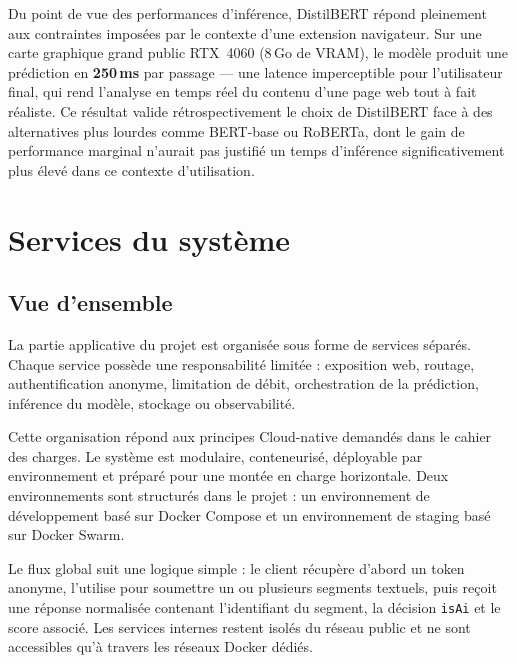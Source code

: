 ﻿\documentclass[12pt, a4paper]{report}
\begin{document}
Du point de vue des performances d'inférence, DistilBERT répond pleinement
aux contraintes imposées par le contexte d'une extension navigateur. Sur
une carte graphique grand public RTX~4060 (8\,Go de VRAM), le modèle
produit une prédiction en \textbf{250\,ms} par passage — une latence
imperceptible pour l'utilisateur final, qui rend l'analyse en temps réel
du contenu d'une page web tout à fait réaliste. Ce résultat valide
rétrospectivement le choix de DistilBERT face à des alternatives plus
lourdes comme BERT-base ou RoBERTa, dont le gain de performance marginal
n'aurait pas justifié un temps d'inférence significativement plus élevé
dans ce contexte d'utilisation.


\chapter{Services du système}

\section{Vue d'ensemble}

La partie applicative du projet est organisée sous forme de services séparés.
Chaque service possède une responsabilité limitée : exposition web, routage,
authentification anonyme, limitation de débit, orchestration de la prédiction,
inférence du modèle, stockage ou observabilité.

Cette organisation répond aux principes Cloud-native demandés dans le cahier des
charges. Le système est modulaire, conteneurisé, déployable par environnement et
préparé pour une montée en charge horizontale. Deux environnements sont
structurés dans le projet : un environnement de développement basé sur Docker
Compose et un environnement de staging basé sur Docker Swarm.

Le flux global suit une logique simple : le client récupère d'abord un token
anonyme, l'utilise pour soumettre un ou plusieurs segments textuels, puis reçoit
une réponse normalisée contenant l'identifiant du segment, la décision
\texttt{isAi} et le score associé. Les services internes restent isolés du réseau
public et ne sont accessibles qu'à travers les réseaux Docker dédiés.
\end{document}
